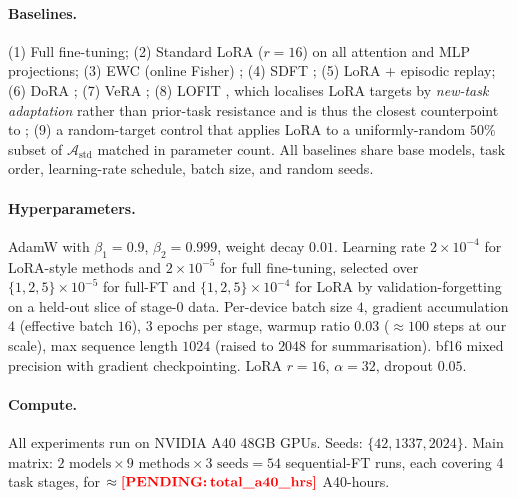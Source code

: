 \paragraph{Baselines.}
(1) Full fine-tuning; (2) Standard LoRA ($r{=}16$) on all attention and MLP projections; (3) EWC (online Fisher) \citep{kirkpatrick2017ewc}; (4) SDFT \citep{shi2024sdft}; (5) LoRA + episodic replay; (6) DoRA \citep{liu2024dora}; (7) VeRA \citep{kopiczko2024vera}; (8) LOFIT \citep{yin2024lofit}, which localises LoRA targets by \textit{new-task adaptation} rather than prior-task resistance and is thus the closest counterpoint to \tglora{}; (9) a random-target control that applies LoRA to a uniformly-random $50\%$ subset of $\mathcal{A}_{\mathrm{std}}$ matched in parameter count. All baselines share base models, task order, learning-rate schedule, batch size, and random seeds.

\paragraph{Hyperparameters.} AdamW \citep{loshchilov2019adamw} with $\beta_1{=}0.9$, $\beta_2{=}0.999$, weight decay $0.01$. Learning rate $2\!\times\!10^{-4}$ for LoRA-style methods and $2\!\times\!10^{-5}$ for full fine-tuning, selected over $\{1, 2, 5\}\!\times\!10^{-5}$ for full-FT and $\{1, 2, 5\}\!\times\!10^{-4}$ for LoRA by validation-forgetting on a held-out slice of stage-0 data. Per-device batch size $4$, gradient accumulation $4$ (effective batch $16$), $3$ epochs per stage, warmup ratio $0.03$ ($\approx100$ steps at our scale), max sequence length $1024$ (raised to $2048$ for summarisation). bf16 mixed precision with gradient checkpointing. LoRA $r{=}16$, $\alpha{=}32$, dropout $0.05$.

\paragraph{Compute.} All experiments run on NVIDIA A40 48GB GPUs. Seeds: $\{42, 1337, 2024\}$. Main matrix: $2\text{ models} \times 9\text{ methods} \times 3\text{ seeds} = 54$ sequential-FT runs, each covering 4 task stages, for $\approx \pend{total_a40_hrs}$ A40-hours.
